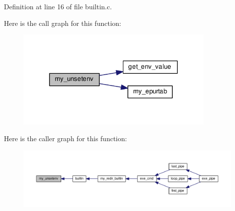 Definition at line 16 of file builtin.\-c.



Here is the call graph for this function\-:\nopagebreak
\begin{figure}[H]
\begin{center}
\leavevmode
\includegraphics[width=276pt]{builtin_8h_ab15f4c5af8f204fcf26ff0bf30391b77_cgraph}
\end{center}
\end{figure}




Here is the caller graph for this function\-:
\nopagebreak
\begin{figure}[H]
\begin{center}
\leavevmode
\includegraphics[width=350pt]{builtin_8h_ab15f4c5af8f204fcf26ff0bf30391b77_icgraph}
\end{center}
\end{figure}


